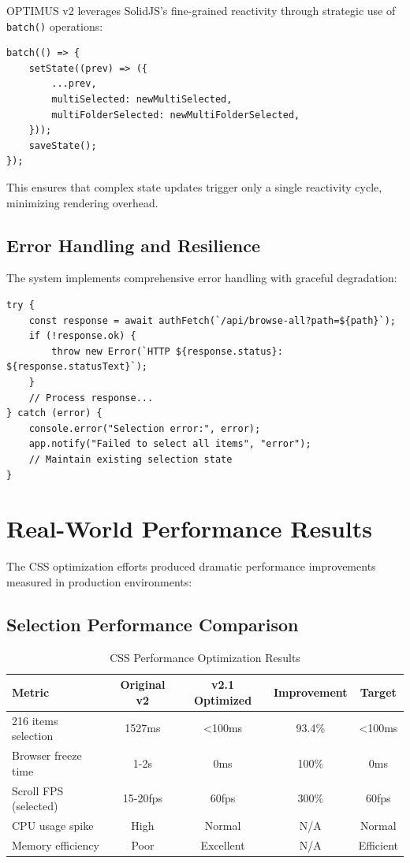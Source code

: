 \documentclass[10pt]{article}
\begin{document}
OPTIMUS v2 leverages SolidJS's fine-grained reactivity through strategic use of \texttt{batch()} operations:

\begin{lstlisting}[caption={Batched State Updates}]
batch(() => {
    setState((prev) => ({
        ...prev,
        multiSelected: newMultiSelected,
        multiFolderSelected: newMultiFolderSelected,
    }));
    saveState();
});
\end{lstlisting}

This ensures that complex state updates trigger only a single reactivity cycle, minimizing rendering overhead.

\subsection{Error Handling and Resilience}

The system implements comprehensive error handling with graceful degradation:

\begin{lstlisting}[caption={Error Handling Strategy}]
try {
    const response = await authFetch(`/api/browse-all?path=${path}`);
    if (!response.ok) {
        throw new Error(`HTTP ${response.status}: ${response.statusText}`);
    }
    // Process response...
} catch (error) {
    console.error("Selection error:", error);
    app.notify("Failed to select all items", "error");
    // Maintain existing selection state
}
\end{lstlisting}

\section{Real-World Performance Results}

The CSS optimization efforts produced dramatic performance improvements measured in production environments:

\subsection{Selection Performance Comparison}

\begin{table}[H]
\centering
\begin{tabular}{@{}lcccc@{}}
\toprule
\textbf{Metric} & \textbf{Original v2} & \textbf{v2.1 Optimized} & \textbf{Improvement} & \textbf{Target} \\
\midrule
216 items selection & 1527ms & <100ms & 93.4\% & <100ms \\
Browser freeze time & 1-2s & 0ms & 100\% & 0ms \\
Scroll FPS (selected) & 15-20fps & 60fps & 300\% & 60fps \\
CPU usage spike & High & Normal & N/A & Normal \\
Memory efficiency & Poor & Excellent & N/A & Efficient \\
\bottomrule
\end{tabular}
\caption{CSS Performance Optimization Results}
\end{table}
\end{document}
